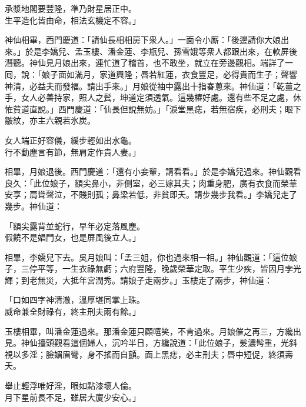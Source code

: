\begin{myquote}
承漿地閣要豐隆，準乃財星居正中。\\生平造化皆由命，相法玄機定不容。」
\end{myquote}

神仙相畢，西門慶道：「請仙長相相房下衆人。」一面令小厮：「後邊請你大娘出來。」於是李嬌兒、孟玉樓、潘金蓮、李瓶兒、孫雪娥等衆人都跟出來，在軟屏後潛聽。神仙見月娘出來，連忙道了稽首，也不敢坐，就立在旁邊觀相。端詳了一囘，說：「娘子面如滿月，家道興隆；唇若紅蓮，衣食豐足，必得貴而生子；聲響神清，必益夫而發福。請出手來。」月娘從袖中露出十指春蔥來。神仙道：「乾薑之手，女人必善持家，照人之鬂，坤道定須透氣。這幾樁好處。還有些不足之處，休恠貧道直說。」西門慶道：「仙長但說無妨。」「淚堂黑痣，若無宿疾，必刑夫；眼下皺紋，亦主六親若氷炭。

\begin{myquote}
女人端正好容儀，緩步輕如出水龜。\\行不動塵言有節，無肩定作貴人妻。」
\end{myquote}

相畢，月娘退後。西門慶道：「還有小妾輩，請看看。」於是李嬌兒過來。神仙觀看良久：「此位娘子，額尖鼻小，非側室，必三嫁其夫；肉重身肥，廣有衣食而榮華安享；肩聳聲泣，不賤則孤；鼻梁若低，非貧即夭。{}請步幾步我看。」李嬌兒走了幾步。神仙道：

\begin{myquote}
「額尖露背並蛇行，早年必定落風塵。\\假饒不是娼門女，也是屏風後立人。」
\end{myquote}

相畢，李嬌兒下去。吳月娘叫：「孟三姐，你也過來相一相。」神仙觀道：「這位娘子，三停平等，一生衣祿無虧；六府豐隆，晚歲榮華定取。平生少疾，皆因月孛光輝；到老無災，大抵年宮潤秀。請娘子走兩步。」玉樓走了兩步，神仙道：

\begin{myquote}
「口如四字神清澈，溫厚堪同掌上珠。\\威命兼全財祿有，終主刑夫兩有餘。」
\end{myquote}

玉樓相畢，叫潘金蓮過來。那潘金蓮只顧嘻笑，不肯過來。{}月娘催之再三，方纔出見。神仙擡頭觀看這個婦人，沉吟半日，方纔說道：「此位娘子，髮濃髩重，{}光斜視以多淫；臉媚眉彎，身不搖而自顫。面上黑痣，必主刑夫；唇中短促，終須壽夭。

\begin{myquote}
舉止輕浮唯好淫，眼如點漆壞人倫。\\月下星前長不足，雖居大廈少安心。」
\end{myquote}

